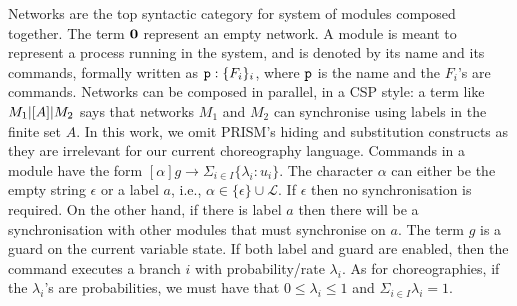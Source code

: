 Networks are the top syntactic category for system of modules composed
together. The term $\mathbf{0}$ represent an empty network. A module is
meant to represent a process running in the system, and is denoted by
its name and its commands, formally written as $\mathtt{p}:\{F_i\}_i$,
where $\mathtt{p}$ is the name and the $F_i$'s are commands. Networks can
be composed in parallel, in a CSP style: a term like $M_1 |[A]| M_2$
says that networks $M_1$ and $M_2$ can synchronise using labels in the
finite set $A$.
%
In this work, we omit PRISM's hiding and substitution constructs as
they are irrelevant for our current choreography language.
%
Commands in a module have the form
$[\alpha] g \rightarrow \Sigma_{i\in I}\{\lambda_i: u_i\}$. The
character $\alpha$ can either be the empty string $\epsilon$ or a
label $a$, i.e., $\alpha\in\{\epsilon\}\cup \mathcal L$. If $\epsilon$
then no synchronisation is required. On the other hand, if there is
label $a$ then there will be a synchronisation with other modules that
must synchronise on $a$. The term $g$ is a guard on the current
variable state. If both label and guard are enabled, then the command
executes a branch $i$ with probability/rate $\lambda_i$. As for
choreographies, if the $\lambda_i$'s are probabilities, we must have
that $0\leq\lambda_i\leq 1$ and $\Sigma_{i\in I}\lambda_i=1$.

